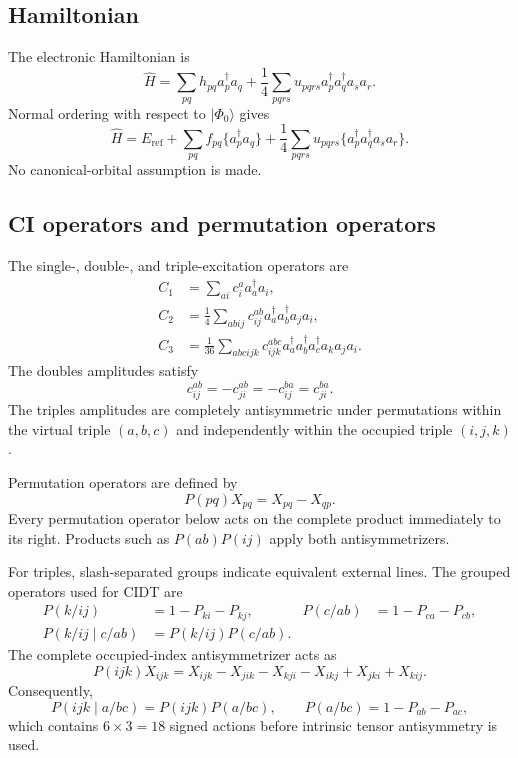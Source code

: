 \documentclass[11pt]{article}
\newcommand{\Eref}{E_{\mathrm{ref}}}
\newcommand{\cre}[1]{a_{#1}^{\dagger}}
\newcommand{\ann}[1]{a_{#1}}
\newcommand{\vac}{\Phi_0}
\begin{document}
\subsection{Hamiltonian}

The electronic Hamiltonian is
\begin{equation}
 \hat{H}
 = \sum_{pq}h_{pq}\cre{p}\ann{q}
 + \frac{1}{4}\sum_{pqrs}u_{pqrs}
   \cre{p}\cre{q}\ann{s}\ann{r}.
\end{equation}
Normal ordering with respect to $\lvert\vac\rangle$ gives
\begin{equation}
 \hat{H}
 = \Eref
 + \sum_{pq} f_{pq}\{\cre{p}\ann{q}\}
 + \frac{1}{4}\sum_{pqrs}u_{pqrs}
   \{\cre{p}\cre{q}\ann{s}\ann{r}\}.
\end{equation}
No canonical-orbital assumption is made.

\subsection{CI operators and permutation operators}

The single-, double-, and triple-excitation operators are
\begin{align}
 C_1
 &= \sum_{ai}c_i^a\cre{a}\ann{i},
 \\
 C_2
 &= \frac{1}{4}\sum_{abij}c_{ij}^{ab}
    \cre{a}\cre{b}\ann{j}\ann{i},
 \\
 C_3
 &= \frac{1}{36}\sum_{abcijk}c_{ijk}^{abc}
    \cre{a}\cre{b}\cre{c}\ann{k}\ann{j}\ann{i}.
\end{align}
The doubles amplitudes satisfy
\begin{equation}
 c_{ij}^{ab}=-c_{ji}^{ab}=-c_{ij}^{ba}=c_{ji}^{ba}.
\end{equation}
The triples amplitudes are completely antisymmetric under permutations within
the virtual triple $(a,b,c)$ and independently within the occupied triple
$(i,j,k)$.

Permutation operators are defined by
\begin{equation}
 P(pq)X_{pq}=X_{pq}-X_{qp}.
\end{equation}
Every permutation operator below acts on the complete product immediately
to its right.  Products such as $P(ab)P(ij)$ apply both antisymmetrizers.

For triples, slash-separated groups indicate equivalent external lines.  The
grouped operators used for CIDT are
\begin{align}
 P(k/ij)
 &= 1-P_{ki}-P_{kj},
 &
 P(c/ab)
 &= 1-P_{ca}-P_{cb},
 \\
 P(k/ij\mid c/ab)
 &= P(k/ij)P(c/ab).
\end{align}
The complete occupied-index antisymmetrizer acts as
\begin{equation}
 P(ijk)X_{ijk}
 =X_{ijk}-X_{jik}-X_{kji}-X_{ikj}+X_{jki}+X_{kij}.
\end{equation}
Consequently,
\begin{equation}
 P(ijk\mid a/bc)=P(ijk)P(a/bc),
 \qquad
 P(a/bc)=1-P_{ab}-P_{ac},
\end{equation}
which contains $6\times3=18$ signed actions before intrinsic tensor
antisymmetry is used.
\end{document}
